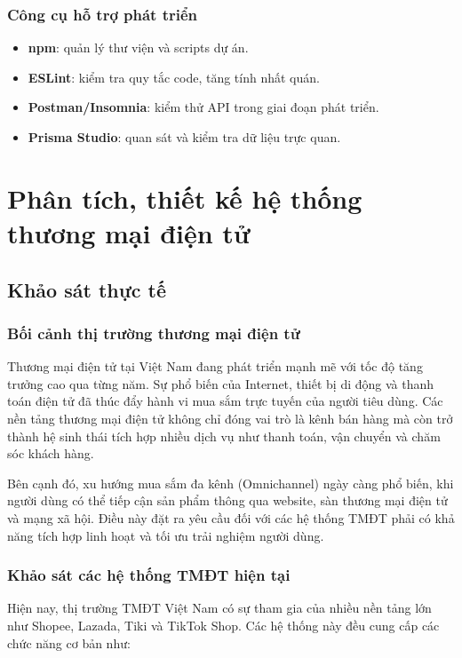 \documentclass[13pt]{article}
\begin{document}
\subsubsection{Công cụ hỗ trợ phát triển}
\begin{itemize}
    \item \textbf{npm}: quản lý thư viện và scripts dự án.
    \item \textbf{ESLint}: kiểm tra quy tắc code, tăng tính nhất quán.
    \item \textbf{Postman/Insomnia}: kiểm thử API trong giai đoạn phát triển.
    \item \textbf{Prisma Studio}: quan sát và kiểm tra dữ liệu trực quan.
\end{itemize}

\section{Phân tích, thiết kế hệ thống thương mại điện tử}

\subsection{Khảo sát thực tế}

\subsubsection{Bối cảnh thị trường thương mại điện tử}

Thương mại điện tử tại Việt Nam đang phát triển mạnh mẽ với tốc độ tăng trưởng cao qua từng năm. Sự phổ biến của Internet, thiết bị di động và thanh toán điện tử đã thúc đẩy hành vi mua sắm trực tuyến của người tiêu dùng. Các nền tảng thương mại điện tử không chỉ đóng vai trò là kênh bán hàng mà còn trở thành hệ sinh thái tích hợp nhiều dịch vụ như thanh toán, vận chuyển và chăm sóc khách hàng.

Bên cạnh đó, xu hướng mua sắm đa kênh (Omnichannel) ngày càng phổ biến, khi người dùng có thể tiếp cận sản phẩm thông qua website, sàn thương mại điện tử và mạng xã hội. Điều này đặt ra yêu cầu đối với các hệ thống TMĐT phải có khả năng tích hợp linh hoạt và tối ưu trải nghiệm người dùng.

\subsubsection{Khảo sát các hệ thống TMĐT hiện tại}

Hiện nay, thị trường TMĐT Việt Nam có sự tham gia của nhiều nền tảng lớn như Shopee, Lazada, Tiki và TikTok Shop. Các hệ thống này đều cung cấp các chức năng cơ bản như:
\end{document}
